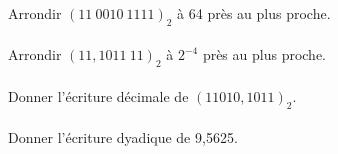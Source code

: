 \documentclass[a4paper,12pt,eval,firamath]{nsi}
\begin{document}
\maketitle

Arrondir $(11\ 0010\ 1111)_2$ à 64 près au plus proche.\\

\\


Arrondir $(11, 1011\ 11)_2$ à $2^{-4}$ près au plus proche.\\

\\

Donner l'écriture décimale de $(11010,1011)_2$.\\

\\

Donner l'écriture dyadique de 9,5625.\\

\end{document}
